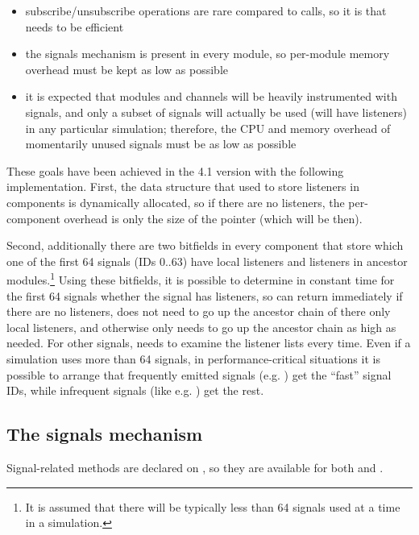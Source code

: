 \begin{itemize}
  \item subscribe/unsubscribe operations are rare compared to 
    calls, so it is  that needs to be efficient
  \item the signals mechanism is present in every module, so per-module
    memory overhead must be kept as low as possible
  \item it is expected that modules and channels will be heavily instrumented
    with signals, and only a subset of signals will actually be used
    (will have listeners) in any particular simulation; therefore,
    the CPU and memory overhead of momentarily unused signals must be
    as low as possible
\end{itemize}

These goals have been achieved in the 4.1 version with the following
implementation. First, the data structure that used to store listeners in
components is dynamically allocated, so if there are no listeners, the
per-component overhead is only the size of the pointer (which will be
 then).

Second, additionally there are two bitfields in every component that store
which one of the first 64 signals (IDs 0..63) have local listeners and
listeners in ancestor modules.\footnote{It is assumed that there will be
typically less than 64 signals used at a time in a simulation.} Using these
bitfields, it is possible to determine in constant time for the first 64
signals whether the signal has listeners, so  can return
immediately if there are no listeners, does not need to go up the ancestor
chain of there only local listeners, and otherwise only needs to go up the
ancestor chain as high as needed. For other signals,  needs
to examine the listener lists every time. Even if a simulation uses more
than 64 signals, in performance-critical situations it is possible to
arrange that frequently emitted signals (e.g. ) get the
``fast'' signal IDs, while infrequent signals (like e.g.
) get the rest.


\subsection{The signals mechanism}
\label{sec:simple-modules:signals-api}

Signal-related methods are declared on , so they are available
for both  and .

